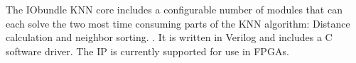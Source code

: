 The IObundle KNN core includes a configurable number of modules that can each solve the two most time consuming parts of
the KNN algorithm: Distance calculation and neighbor sorting.
. It is written in Verilog and includes a C software driver.
The IP is currently supported for use in FPGAs.
